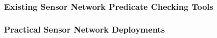 \begin{comment}
\cite{1382572, 749477, ?}. However, in distributed systems there are additional challenges to overcome \cite{5010224}

What can be meant by `detecting bugs', in non-distributed systems there are many different classes of bugs \cite{?}, when we consider distributed systems many of those bugs have new vectors in which they can arise. For example deadlock can now occur across motes if both motes are waiting on receiving a message the other mote should be sending. The fact that these systems are distributed means that debugging these kind of problems becomes harder \cite{?}. Also there are new ways bugs can arise, for example in the routing of information, if a message being sent is stuck being transmitted in a cycle of nodes it will never reach its destination. This type of problem requires lots of resources (either memory or large messages) to be able to effectively debug \cite{?}.
\end{comment}


\subsubsection*{Existing Sensor Network Predicate Checking Tools}


\subsubsection*{Practical Sensor Network Deployments}



